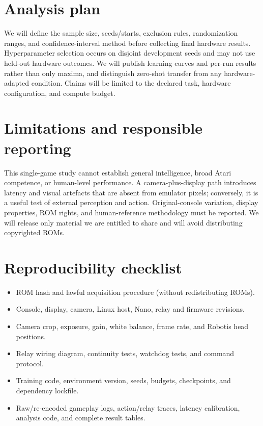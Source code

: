 \documentclass[11pt]{article}
\begin{document}
\section{Analysis plan}

We will define the sample size, seeds/starts, exclusion rules, randomization
ranges, and confidence-interval method before collecting final hardware
results.  Hyperparameter selection occurs on disjoint development seeds and
may not use held-out hardware outcomes.  We will publish learning curves and
per-run results rather than only maxima, and distinguish zero-shot transfer
from any hardware-adapted condition.  Claims will be limited to the declared
task, hardware configuration, and compute budget.

\section{Limitations and responsible reporting}

This single-game study cannot establish general intelligence, broad Atari
competence, or human-level performance.  A camera-plus-display path introduces
latency and visual artefacts that are absent from emulator pixels; conversely,
it is a useful test of external perception and action.  Original-console
variation, display properties, ROM rights, and human-reference methodology
must be reported.  We will release only material we are entitled to share and
will avoid distributing copyrighted ROMs.

\section{Reproducibility checklist}

\begin{itemize}[leftmargin=*]
  \item ROM hash and lawful acquisition procedure (without redistributing ROMs).
  \item Console, display, camera, Linux host, Nano, relay and firmware revisions.
  \item Camera crop, exposure, gain, white balance, frame rate, and Robotis
        head positions.
  \item Relay wiring diagram, continuity tests, watchdog tests, and command
        protocol.
  \item Training code, environment version, seeds, budgets, checkpoints, and
        dependency lockfile.
  \item Raw/re-encoded gameplay logs, action/relay traces, latency calibration,
        analysis code, and complete result tables.
\end{itemize}
\end{document}
